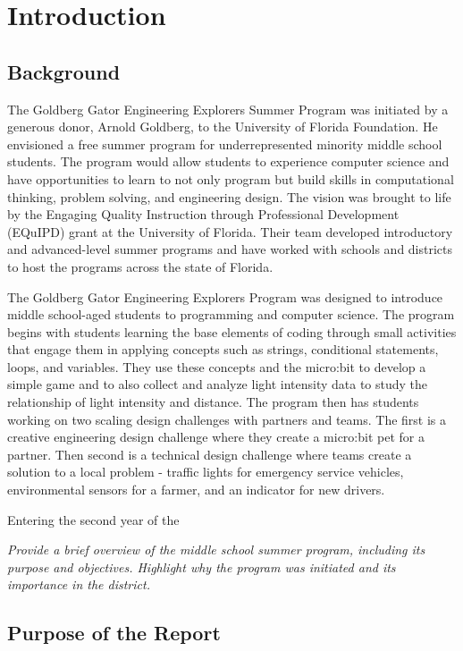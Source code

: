 \documentclass[
]{article}
\begin{document}
\hypertarget{introduction}{%
\section{Introduction}\label{introduction}}

\hypertarget{background}{%
\subsection{Background}\label{background}}

The Goldberg Gator Engineering Explorers Summer Program was initiated by
a generous donor, Arnold Goldberg, to the University of Florida
Foundation. He envisioned a free summer program for underrepresented
minority middle school students. The program would allow students to
experience computer science and have opportunities to learn to not only
program but build skills in computational thinking, problem solving, and
engineering design. The vision was brought to life by the Engaging
Quality Instruction through Professional Development (EQuIPD) grant at
the University of Florida. Their team developed introductory and
advanced-level summer programs and have worked with schools and
districts to host the programs across the state of Florida.

The Goldberg Gator Engineering Explorers Program was designed to
introduce middle school-aged students to programming and computer
science. The program begins with students learning the base elements of
coding through small activities that engage them in applying concepts
such as strings, conditional statements, loops, and variables. They use
these concepts and the micro:bit to develop a simple game and to also
collect and analyze light intensity data to study the relationship of
light intensity and distance. The program then has students working on
two scaling design challenges with partners and teams. The first is a
creative engineering design challenge where they create a micro:bit pet
for a partner. Then second is a technical design challenge where teams
create a solution to a local problem - traffic lights for emergency
service vehicles, environmental sensors for a farmer, and an indicator
for new drivers.

Entering the second year of the

\emph{Provide a brief overview of the middle school summer program,
including its purpose and objectives. Highlight why the program was
initiated and its importance in the district.}

\hypertarget{purpose-of-the-report}{%
\subsection{Purpose of the Report}\label{purpose-of-the-report}}
\end{document}
